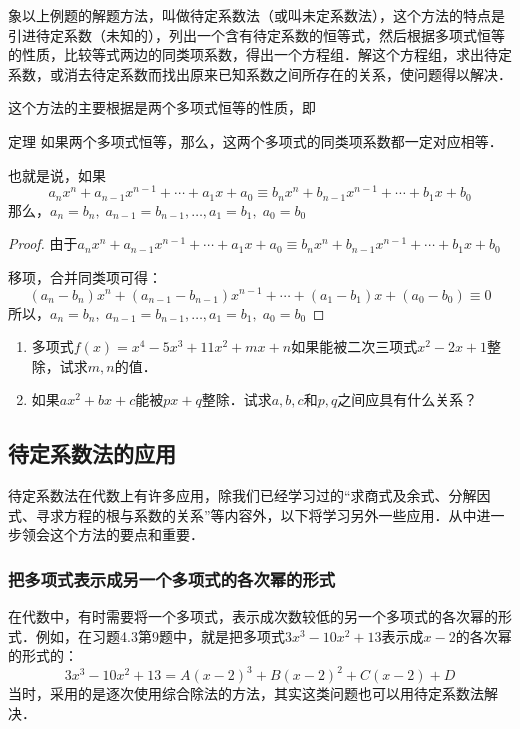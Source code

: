 象以上例题的解题方法，叫做待定系数法（或叫未定系数法），这个方法的特点是引进待定系数（未知的），列出一个含有待定系数的恒等式，然后根据多项式恒等的性质，比较等式两边的同类项系数，得出一个方程组．解这个方程组，求出待定系数，或消去待定系数而找出原来已知系数之间所存在的关系，使问题得以解决．

这个方法的主要根据是两个多项式恒等的性质，即

\begin{blk}{定理}
    如果两个多项式恒等，那么，这两个多项式的同类项系数都一定对应相等．
\end{blk}

也就是说，如果 
$$a_nx^n+a_{n-1}x^{n-1}+\cdots+a_1x+a_0\equiv b_nx^n+b_{n-1}x^{n-1}+\cdots+b_1x+b_0$$
那么，$a_n=b_n,\; a_{n-1}=b_{n-1},\ldots, a_1=b_1,\; a_0=b_0$

\begin{proof}
由于$a_nx^n+a_{n-1}x^{n-1}+\cdots+a_1x+a_0\equiv b_nx^n+b_{n-1}x^{n-1}+\cdots+b_1x+b_0$

移项，合并同类项可得：
\[(a_n-b_n)x^n+(a_{n-1}-b_{n-1})x^{n-1}+\cdots + (a_1-b_1)x+(a_0-b_0)\equiv 0\]
所以，$a_n=b_n,\; a_{n-1}=b_{n-1},\ldots, a_1=b_1,\; a_0=b_0$
\end{proof}

\begin{ex}
\begin{enumerate}
\item  多项式$f(x)=x^4-5x^3+11x^2+mx+n$如果能被二次三项式$x^2-2x+1$整除，试求$m,n$的值．
\item  如果$ax^2+bx+c$能被$px+q$整除．试求$a,b,c$和$p,q$之间应具有什么关系？
\end{enumerate}

\end{ex}

\subsection{待定系数法的应用}
待定系数法在代数上有许多应用，除我们已经学习过的“求商式及余式、分解因式、寻求方程的根与系数的关系”等内容外，以下将学习另外一些应用．从中进一步领会这个方法的要点和重要．

\subsubsection{把多项式表示成另一个多项式的各次幂的形式}

在代数中，有时需要将一个多项式，表示成次数较低的另一个多项式的各次幂的形式．例如，在习题4.3第9题中，就是把多项式$3x^3-10x^2+13$表示成$x-2$的各次幂的形式的：
\[3x^3-10x^2+13=A (x-2)^3 +B (x-2)^2+ C (x-2) +D\]
当时，采用的是逐次使用综合除法的方法，其实这类问题也可以用待定系数法解决．


